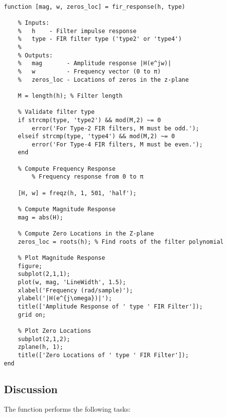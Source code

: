 \documentclass[a4paper,12pt]{article}
\begin{document}
\begin{verbatim}

function [mag, w, zeros_loc] = fir_response(h, type)
 
    % Inputs:
    %   h    - Filter impulse response
    %   type - FIR filter type ('type2' or 'type4')
    %
    % Outputs:
    %   mag       - Amplitude response |H(e^jw)|
    %   w         - Frequency vector (0 to π)
    %   zeros_loc - Locations of zeros in the z-plane
    
    M = length(h); % Filter length
    
    % Validate filter type
    if strcmp(type, 'type2') && mod(M,2) ~= 0
        error('For Type-2 FIR filters, M must be odd.');
    elseif strcmp(type, 'type4') && mod(M,2) ~= 0
        error('For Type-4 FIR filters, M must be even.');
    end

    % Compute Frequency Response
        % Frequency response from 0 to π

    [H, w] = freqz(h, 1, 501, 'half');
    
    % Compute Magnitude Response
    mag = abs(H);

    % Compute Zero Locations in the Z-plane
    zeros_loc = roots(h); % Find roots of the filter polynomial

    % Plot Magnitude Response
    figure;
    subplot(2,1,1);
    plot(w, mag, 'LineWidth', 1.5);
    xlabel('Frequency (rad/sample)');
    ylabel('|H(e^{j\omega})|');
    title(['Amplitude Response of ' type ' FIR Filter']);
    grid on;

    % Plot Zero Locations
    subplot(2,1,2);
    zplane(h, 1);
    title(['Zero Locations of ' type ' FIR Filter']);
end
\end{verbatim}

\subsection{Discussion}

The function performs the following tasks:
\end{document}
